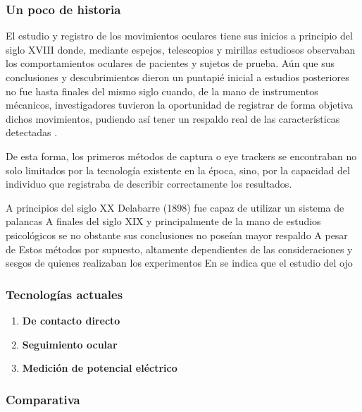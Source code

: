 \documentclass[../main.tex]{subfiles}
\begin{document}
			\subsubsection{Un poco de historia}
			\label{ssub:02_un_poco_de_historia_tracker}

			El estudio y registro de los movimientos oculares tiene sus inicios a principio del siglo XVIII donde, mediante espejos, telescopios y mirillas estudiosos observaban los comportamientos oculares de pacientes y sujetos de prueba. Aún que sus conclusiones y descubrimientos dieron un puntapié inicial a estudios posteriores no fue hasta finales del mismo siglo cuando, de la mano de instrumentos mécanicos, investigadores tuvieron la oportunidad de registrar de forma objetiva dichos movimientos, pudiendo así tener un respaldo real de las características detectadas \cite{article:eyetracker_eggert}.

			De esta forma, los primeros métodos de captura o eye trackers se encontraban no solo limitados por la tecnología existente en la época, sino, por la capacidad del individuo que registraba de describir correctamente los resultados. 

			A principios del siglo XX Delabarre (1898) \cite{article:eyetracker_richardson} fue capaz de utilizar un sistema de palancas 
			A finales del siglo XIX y principalmente de la mano de estudios psicológicos se   no obstante sus conclusiones no poseían mayor respaldo  A pesar de Estos métodos por supuesto, altamente dependientes de las consideraciones y sesgos de quienes realizaban los experimentos 
			En  se indica que el estudio del ojo 

			\subsubsection{Tecnologías actuales}
			\label{ssub:02_tecnologias_actuales}
				\begin{enumerate}
					\item \textbf{De contacto directo}

					\item \textbf{Seguimiento ocular}

					\item \textbf{Medición de potencial eléctrico}

				\end{enumerate}

			\subsubsection{Comparativa}
			\label{ssub:02_comparativa_eyetracker}
			
\end{document}
